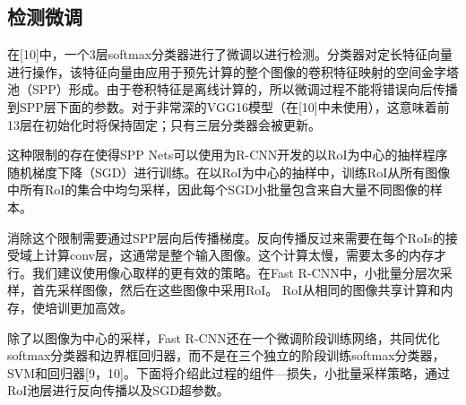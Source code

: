 \subsection {检测微调}
\par 在[10]中，一个3层softmax分类器进行了微调以进行检测。分类器对定长特征向量进行操作，该特征向量由应用于预先计算的整个图像的卷积特征映射的空间金字塔池（SPP）形成。由于卷积特征是离线计算的，所以微调过程不能将错误向后传播到SPP层下面的参数。对于非常深的VGG16模型（在[10]中未使用），这意味着前13层在初始化时将保持固定；只有三层分类器会被更新。
\par 这种限制的存在使得SPP Nets可以使用为R-CNN开发的以RoI为中心的抽样程序随机梯度下降（SGD）进行训练。在以RoI为中心的抽样中，训练RoI从所有图像中所有RoI的集合中均匀采样，因此每个SGD小批量包含来自大量不同图像的样本。
\par 消除这个限制需要通过SPP层向后传播梯度。反向传播反过来需要在每个RoIs的接受域上计算conv层，这通常是整个输入图像。这个计算太慢，需要太多的内存才行。我们建议使用像心取样的更有效的策略。在Fast R-CNN中，小批量分层次采样，首先采样图像，然后在这些图像中采用RoI。 RoI从相同的图像共享计算和内存，使培训更加高效。
\par 除了以图像为中心的采样，Fast R-CNN还在一个微调阶段训练网络，共同优化softmax分类器和边界框回归器，而不是在三个独立的阶段训练softmax分类器，SVM和回归器[9，10]。下面将介绍此过程的组件—损失，小批量采样策略，通过RoI池层进行反向传播以及SGD超参数。
